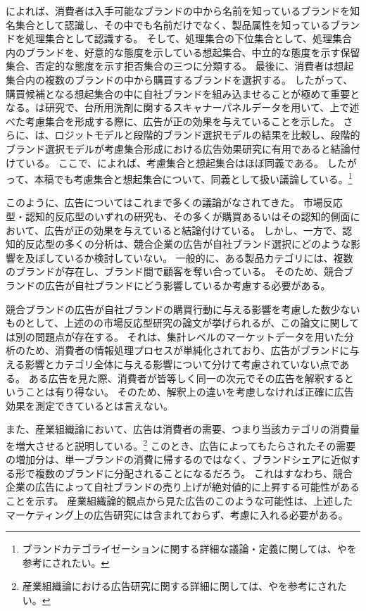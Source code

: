 \documentclass[11pt]{jsarticle}
\begin{document}
\newpage

\citet{brisoux1980}によれば、消費者は入手可能なブランドの中から名前を知っているブランドを知名集合として認識し、その中でも名前だけでなく、製品属性を知っているブランドを処理集合として認識する。
そして、処理集合の下位集合として、処理集合内のブランドを、好意的な態度を示している想起集合、中立的な態度を示す保留集合、否定的な態度を示す拒否集合の三つに分類する。
最後に、消費者は想起集合内の複数のブランドの中から購買するブランドを選択する。
したがって、購買候補となる想起集合の中に自社ブランドを組み込ませることが極めて重要となる。\citet{saito1999}は研究で、台所用洗剤に関するスキャナーパネルデータを用いて、上で述べた考慮集合を形成する際に、広告が正の効果を与えていることを示した。
さらに、\citet{saito1999}は、ロジットモデルと段階的ブランド選択モデルの結果を比較し、段階的ブランド選択モデルが考慮集合形成における広告効果研究に有用であると結論付けている。
ここで、\citet{urano2012}によれば、考慮集合と想起集合はほぼ同義である。
したがって、本稿でも考慮集合と想起集合について、同義として扱い議論している。\footnote{ブランドカテゴライゼーションに関する詳細な議論・定義に関しては、\citet{onzo1995}や\citet{katsumata2011}を参考にされたい。}

このように、広告についてはこれまで多くの議論がなされてきた。
市場反応型・認知的反応型のいずれの研究も、その多くが購買あるいはその認知的側面において、広告が正の効果を与えていると結論付けている。
しかし、一方で、認知的反応型の多くの分析は、競合企業の広告が自社ブランド選択にどのような影響を及ぼしているか検討していない。
一般的に、ある製品カテゴリには、複数のブランドが存在し、ブランド間で顧客を奪い合っている。
そのため、競合ブランドの広告が自社ブランドにどう影響しているか考慮する必要がある。

競合ブランドの広告が自社ブランドの購買行動に与える影響を考慮した数少ないものとして、上述の\citet{shimizu1990}の市場反応型研究の論文が挙げられるが、この論文に関しては別の問題点が存在する。
それは、集計レベルのマーケットデータを用いた分析のため、消費者の情報処理プロセスが単純化されており、広告がブランドに与える影響とカテゴリ全体に与える影響について分けて考慮されていない点である。
ある広告を見た際、消費者が皆等しく同一の次元でその広告を解釈するということは有り得ない。
そのため、解釈上の違いを考慮しなければ正確に広告効果を測定できているとは言えない。

また、産業組織論において、広告は消費者の需要、つまり当該カテゴリの消費量を増大させると説明している。\footnote{産業組織論における広告研究に関する詳細に関しては、\citet{uekusa2013}や\citet{nagaoka2013}を参考にされたい。}
このとき、広告によってもたらされたその需要の増加分は、単一ブランドの消費に帰するのではなく、ブランドシェアに近似する形で複数のブランドに分配されることになるだろう。
これはすなわち、競合企業の広告によって自社ブランドの売り上げが絶対値的に上昇する可能性があることを示す。
産業組織論的観点から見た広告のこのような可能性は、上述したマーケティング上の広告研究には含まれておらず、考慮に入れる必要がある。
\end{document}
